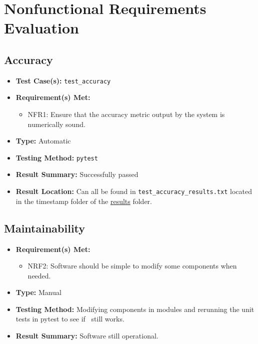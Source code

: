 \documentclass[12pt, titlepage]{article}
\begin{document}
\section{Nonfunctional Requirements Evaluation}

\subsection{Accuracy}
\begin{itemize}
  \item \textbf{Test Case(s): }\texttt{test\_accuracy}
  \item \textbf{Requirement(s) Met: }
  \begin{itemize}
    \item NFR1: Ensure that the accuracy metric output by the system is numerically sound.
  \end{itemize}
  \item \textbf{Type: }Automatic
  \item \textbf{Testing Method: }\texttt{pytest}
  \item \textbf{Result Summary: }Successfully passed
  \item \textbf{Result Location: }Can all be found in \texttt{test\_accuracy\_results.txt} located in the timestamp folder of the \href{https://github.com/AliyahJimoh/2D-Localizer/tree/main/test/results/}{results} folder.
\end{itemize}
		
\subsection{Maintainability}
\begin{itemize}
  \item \textbf{Requirement(s) Met: }
  \begin{itemize}
    \item NRF2: Software should be simple to modify some components when
    needed.
  \end{itemize}
  \item \textbf{Type: }Manual
  \item \textbf{Testing Method: }Modifying components in modules and rerunning the unit tests in pytest to see if \progname~still works.
  \item \textbf{Result Summary: }Software still operational.
\end{itemize}
\end{document}

